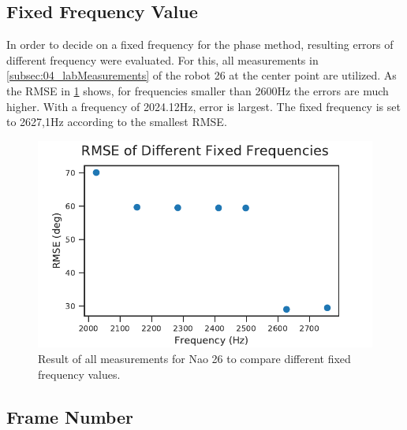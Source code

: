 \subsection{Fixed Frequency Value}
\label{subsec:04_fixedFrequencyVal}

In order to decide on a fixed frequency for the phase method,
resulting errors of different frequency were evaluated.
For this, all measurements in \cref{subsec:04_labMeasurements}
of the robot 26 at the center point are utilized.
As the \ac{RMSE} in \cref{fig:04_diffFc} shows, for frequencies smaller
than 2600\si{\hertz} the errors are much higher.
With a frequency of 2024.12\si{\hertz}, error is largest.
The fixed frequency is set to 2627,1\si{\hertz} according
to the smallest \ac{RMSE}.
\begin{figure}[ht]
	\centering
		\includegraphics[]{figures/evaluation/phase_fc_rmse}
	\caption{Result of all measurements for Nao 26 to compare different
	fixed frequency values.}
	\label{fig:04_diffFc}
\end{figure}
\subsection{Frame Number}
\label{subsec:04_frameNumber}

